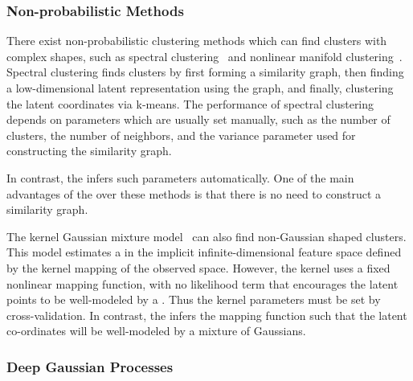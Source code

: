 \subsubsection{Non-probabilistic Methods}

There exist non-probabilistic clustering methods which can find clusters with complex shapes, such as spectral clustering~\citep{ng2002spectral} and nonlinear manifold clustering~\citep{cao2006nonlinear,elhamifar2011sparse}.
Spectral clustering finds clusters by first forming a similarity graph, then finding a low-dimensional latent representation using the graph, and finally, clustering the latent coordinates via k-means.
The performance of spectral clustering depends on parameters which are usually set manually, such as the number of clusters, the number of neighbors, and the variance parameter used for constructing the similarity graph.

In contrast, the \iwmm{} infers such parameters automatically.
One of the main advantages of the \iwmm{} over these methods is that there is no need to construct a similarity graph.

The kernel Gaussian mixture model~\citep{wang2003kernel} can also find non-Gaussian shaped clusters.
This model estimates a \GMM{} in the implicit infinite-dimensional feature space defined by the kernel mapping of the observed space.
However, the kernel \GMM{} uses a fixed nonlinear mapping function, with no likelihood term that encourages the latent points to be well-modeled by a \GMM{}.
Thus the kernel parameters must be set by cross-validation.
In contrast, the \iwmm{} infers the mapping function such that the latent co-ordinates will be well-modeled by a mixture of Gaussians.


\subsubsection{Deep Gaussian Processes}

